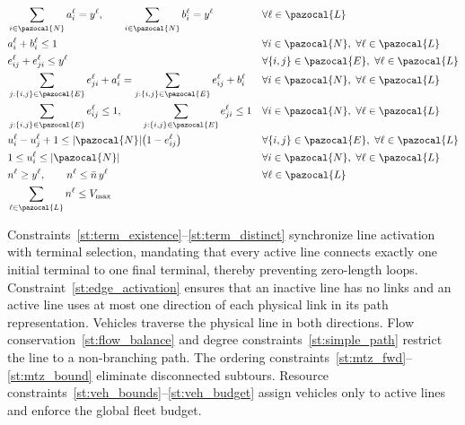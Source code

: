 \documentclass[a4paper,fleqn]{cas-sc}
\begin{document}
\begin{align}
& \sum_{i \in \pazocal{N}} a_i^\ell = y^\ell, \qquad
  \sum_{i \in \pazocal{N}} b_i^\ell = y^\ell
&& \forall \ell \in \pazocal{L} \label{st:term_existence}\\
& a_i^\ell + b_i^\ell \le 1
&& \forall i \in \pazocal{N},\ \forall \ell \in \pazocal{L} \label{st:term_distinct}\\
& e_{ij}^\ell + e_{ji}^\ell \le y^\ell
&& \forall \{i,j\} \in \pazocal{E},\ \forall \ell \in \pazocal{L} \label{st:edge_activation}\\
& \sum_{j:\{i,j\} \in \pazocal{E}} e_{ji}^\ell + a_i^\ell
=
\sum_{j:\{i,j\} \in \pazocal{E}} e_{ij}^\ell + b_i^\ell
&& \forall i \in \pazocal{N},\ \forall \ell \in \pazocal{L} \label{st:flow_balance}\\
& \sum_{j:\{i,j\} \in \pazocal{E}} e_{ij}^\ell \le 1, \qquad
  \sum_{j:\{i,j\} \in \pazocal{E}} e_{ji}^\ell \le 1
&& \forall i \in \pazocal{N},\ \forall \ell \in \pazocal{L} \label{st:simple_path}\\
& u_i^\ell - u_j^\ell + 1
\le |\pazocal{N}| \big(1-e_{ij}^\ell\big)
&& \forall \{i,j\} \in \pazocal{E},\ \forall \ell \in \pazocal{L} \label{st:mtz_fwd}
\\
& 1 \le u_i^\ell \le |\pazocal{N}|
&& \forall i \in \pazocal{N},\ \forall \ell \in \pazocal{L} \label{st:mtz_bound}\\
& n^\ell \ge y^\ell, \qquad
  n^\ell \le \bar n \, y^\ell
&& \forall \ell \in \pazocal{L} \label{st:veh_bounds}\\
& \sum_{\ell \in \pazocal{L}} n^\ell \le V_{\max}
&& \label{st:veh_budget}
\end{align}

Constraints~\eqref{st:term_existence}--\eqref{st:term_distinct} synchronize line activation with terminal selection, mandating that every active line connects exactly one initial terminal to one final terminal, thereby preventing zero-length loops. Constraint~\eqref{st:edge_activation} ensures that an inactive line has no links and an active line uses at most one direction of each physical link in its path representation. Vehicles traverse the physical line in both directions. Flow conservation~\eqref{st:flow_balance} and degree constraints~\eqref{st:simple_path} restrict the line to a non-branching path. The ordering constraints~\eqref{st:mtz_fwd}--\eqref{st:mtz_bound} eliminate disconnected subtours. Resource constraints~\eqref{st:veh_bounds}--\eqref{st:veh_budget} assign vehicles only to active lines and enforce the global fleet budget.
\end{document}
